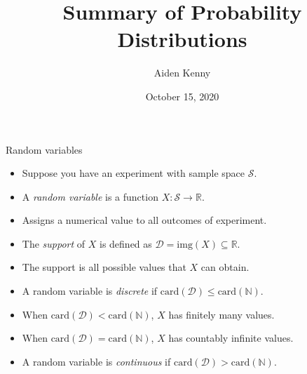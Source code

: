 \documentclass[8pt, handout]{beamer}
\title{Summary of Probability Distributions}
\author{Aiden Kenny}
\institute{STAT GR5203: Probability}
\date{October 15, 2020}
\renewcommand{\emph}[1]{\textcolor{defcol}{\textsl{#1}}}
\begin{document}
\begin{frame}{}

    \maketitle

\end{frame}

\begin{frame}{Random variables}

    \begin{itemize}
        \item Suppose you have an experiment with sample space \(\mathcal{S}\).
        \item A \emph{random variable} is a function \(X : \mathcal{S} \to \mathbb{R}\).
        \item Assigns a numerical value to all outcomes of experiment. 
        \vspace{2em}
        \item The \emph{support} of \(X\) is defined as \(\mathcal{D} = \mathrm{img}(X) \subseteq \mathbb{R}\).
        \item The support is all possible values that \(X\) can obtain. 
        \vspace{2em}
        \item A random variable is \emph{discrete} if \(\mathrm{card}(\mathcal{D}) \le \mathrm{card}(\mathbb{N})\).
        \item When \(\mathrm{card}(\mathcal{D}) < \mathrm{card}(\mathbb{N})\), \(X\) has finitely many values.
        \item When \(\mathrm{card}(\mathcal{D}) = \mathrm{card}(\mathbb{N})\), \(X\) has countably infinite values. 
        \vspace{2em}
        \item A random variable is \emph{continuous} if \(\mathrm{card}(\mathcal{D}) > \mathrm{card}(\mathbb{N})\).
    \end{itemize}

\end{frame}
\end{document}
